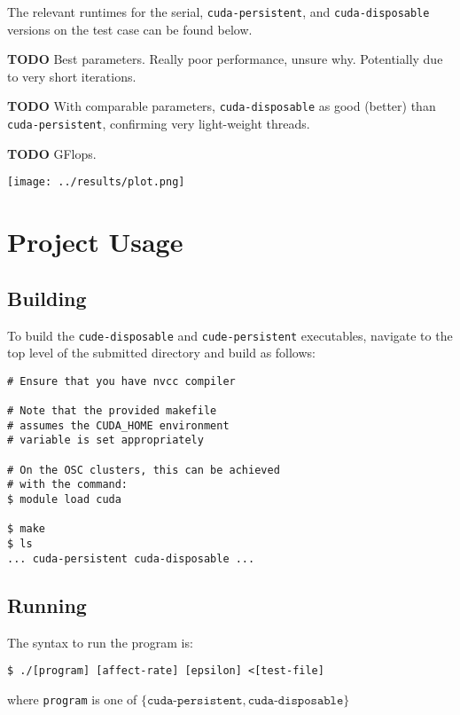 \documentclass{article}
\begin{document}
The relevant runtimes for the serial, \texttt{cuda-persistent}, and \texttt{cuda-disposable}
versions on the test case can be found below.

\textbf{TODO} Best parameters. Really poor performance, unsure why.
Potentially due to very short iterations.

\textbf{TODO} With comparable parameters, \texttt{cuda-disposable} as good (better) than \texttt{cuda-persistent},
confirming very light-weight threads.

\textbf{TODO} GFlops.

\vspace{1em}
\begin{minipage}{\linewidth}
    \centering
    \texttt{[image: ../results/plot.png]}


    \label{fig:runtimes}
\end{minipage}

\section*{Project Usage}
\label{sec:project}

\subsection*{Building}
\label{subsec:building}

To build the \texttt{cude-disposable} and \texttt{cude-persistent} executables, navigate
to the top level of the submitted directory and build as follows:

\begin{lstlisting}[style=DOS]
# Ensure that you have nvcc compiler

# Note that the provided makefile
# assumes the CUDA_HOME environment
# variable is set appropriately

# On the OSC clusters, this can be achieved
# with the command:
$ module load cuda

$ make
$ ls
... cuda-persistent cuda-disposable ...
\end{lstlisting}

\subsection*{Running}
\label{subsec:running}

The syntax to run the program is:

\begin{lstlisting}[style=DOS]
$ ./[program] [affect-rate] [epsilon] <[test-file]
\end{lstlisting}
where \texttt{program} is one of $\{\texttt{cuda-persistent}, \texttt{cuda-disposable}\}$
\end{document}
